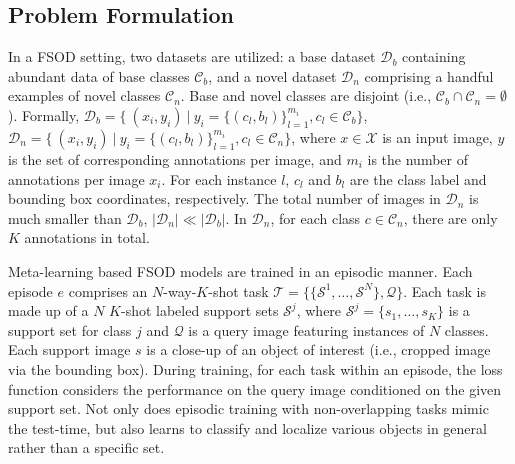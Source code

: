 \documentclass[10pt,twocolumn,letterpaper]{article}
\begin{document}
\subsection{Problem Formulation}
In a FSOD setting, two datasets are utilized: a base dataset $\mathcal{D}_b$ containing abundant data of base classes $\mathcal{C}_b$, and a novel dataset $\mathcal{D}_n$ comprising a handful examples of novel classes $\mathcal{C}_n$.  Base and novel classes are disjoint (i.e., $\mathcal{C}_b \cap \mathcal{C}_n = \emptyset$). Formally, $\mathcal{D}_b=\{\ (x_i, y_i)\ |~y_i = \{(c_l,b_l)\}_{l=1}^{m_{i}}, c_l \in \mathcal{C}_{b}\}$, 
$\mathcal{D}_n=\{\ (x_i, y_i)\ |~y_i = \{(c_l,b_l)\}_{l=1}^{m_{i}}, c_{l} \in \mathcal{C}_{n}\}$, where $x \in \mathcal{X}$ is an input image, $y$ is the set of corresponding annotations per image, and $m_{i}$ is the number of annotations per image $x_i$. For each instance $l$, $c_l$ and $b_l$ are the class label and bounding box coordinates, respectively. The total number of images in $\mathcal{D}_n$ is much smaller than $\mathcal{D}_b$, $\vert\mathcal{D}_n\vert \ll \vert\mathcal{D}_b\vert$. In $\mathcal{D}_{n}$, for each class $c \in \mathcal{C}_n$, there are only $K$ annotations in total. 

Meta-learning based FSOD models are trained in an episodic manner. Each episode $e$ comprises an $N$-way-$K$-shot task $\mathcal{T} = \{\{\mathcal{S}^1, \dots, \mathcal{S}^N\}, \mathcal{Q}\}$. Each task is made up of a $N$ $K$-shot labeled support sets $\mathcal{S}^j$, where $\mathcal{S}^j = \{s_1, \dots, s_K \}$ is a support set for class $j$ and $\mathcal{Q}$ is a query image featuring instances of $N$ classes. Each support image $s$ is a close-up of an object of interest (i.e., cropped image via the bounding box). During training, for each task within an episode, the loss function considers the performance on the query image conditioned on the given support set. Not only does episodic training with non-overlapping tasks mimic the test-time, but also learns to classify and localize various objects in general rather than a specific set. 
\end{document}
